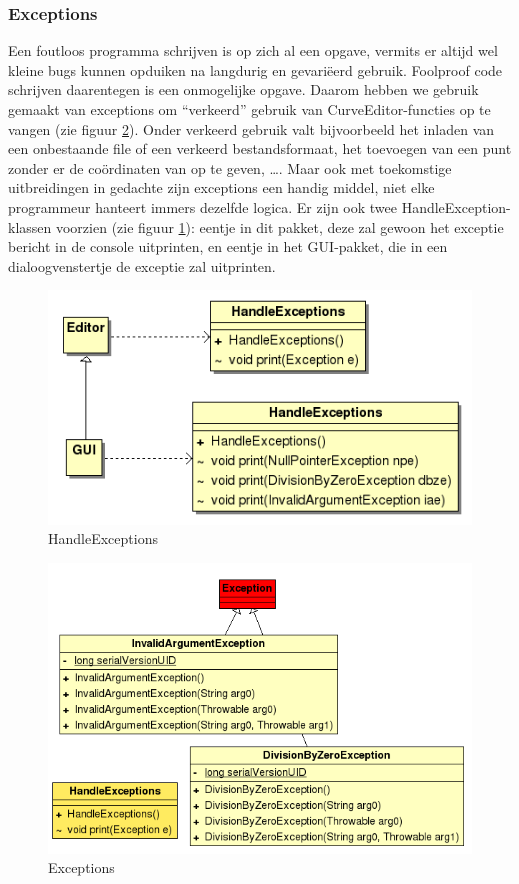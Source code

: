 \documentclass[a4paper,11pt,oneside, titlepage]{article}
\begin{document}
\subsubsection{Exceptions}
Een foutloos programma schrijven is op zich al een opgave, vermits er altijd wel kleine bugs
kunnen opduiken na langdurig en gevari\"eerd gebruik. Foolproof code schrijven daarentegen is een
onmogelijke opgave. Daarom hebben we gebruik gemaakt van exceptions om ``verkeerd'' gebruik van
CurveEditor-functies op te vangen (zie figuur \ref{iExc}). Onder verkeerd gebruik valt bijvoorbeeld het inladen van een
onbestaande file of een verkeerd bestandsformaat, het toevoegen van een punt zonder er de 
co\"ordinaten van op te geven, \ldots. Maar ook met toekomstige uitbreidingen in gedachte zijn exceptions een handig middel,
niet elke programmeur hanteert immers dezelfde logica. 
Er zijn ook twee HandleException-klassen voorzien (zie figuur \ref{iHExc}): eentje in dit pakket, deze zal gewoon 
het exceptie bericht in de console uitprinten, en eentje in het GUI-pakket, die in een dialoogvenstertje de exceptie zal uitprinten.
\begin{figure}[htbp]
\centering
\includegraphics[scale=0.4]{./UML2/HandleExc.png}
\caption{HandleExceptions}\label{iHExc}
\end{figure}
\begin{figure}[htbp]
\centering
\includegraphics[scale=0.4]{./UML2/Exc.png}
\caption{Exceptions}\label{iExc}
\end{figure}
\end{document}
